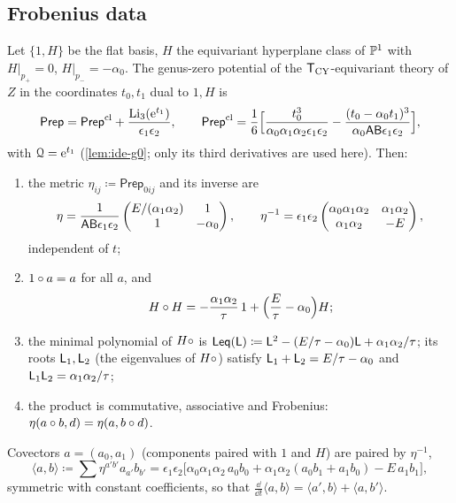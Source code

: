 \subsection{Frobenius data}
\label{sec:set-frob}

\begin{prop}
\label{prop:set-frob}
Let $\{1,H\}$ be the flat basis, $H$ the equivariant hyperplane class of $\mathbb{P}^1$ with $H|_{p_+}=0$, $H|_{p_-}=-\alpha_0$. The genus-zero potential of the $\mathsf{T}_{\mathrm{CY}}$-equivariant theory of $Z$ in the coordinates $t_0,t_1$ dual to $1,H$ is
\[
\mathsf{Prep}=\mathsf{Prep}^{\mathrm{cl}}+\frac{\operatorname{Li}_3(\mathrm{e}^{t_1})}{\epsilon_1\epsilon_2},\qquad
\mathsf{Prep}^{\mathrm{cl}}=\frac16\Big[\frac{t_0^3}{\alpha_0\alpha_1\alpha_2\epsilon_1\epsilon_2}-\frac{(t_0-\alpha_0t_1)^3}{\alpha_0\mathsf{A}\mathsf{B}\epsilon_1\epsilon_2}\Big],
\]
with $\mathcal{Q}=\mathrm{e}^{t_1}$ (\cref{lem:ide-g0}; only its third derivatives are used here). Then:
\begin{enumerate}
\item the metric $\eta_{ij}\coloneqq\mathsf{Prep}_{0ij}$ and its inverse are
\[
\eta=\frac{1}{\mathsf{A}\mathsf{B}\epsilon_1\epsilon_2}\begin{pmatrix}E/(\alpha_1\alpha_2)&1\\1&-\alpha_0\end{pmatrix},\qquad
\eta^{-1}=\epsilon_1\epsilon_2\begin{pmatrix}\alpha_0\alpha_1\alpha_2&\alpha_1\alpha_2\\\alpha_1\alpha_2&-E\end{pmatrix},
\]
independent of $t$;
\item $1\circ a=a$ for all $a$, and
\[
H\circ H=-\frac{\alpha_1\alpha_2}{\tau}\,1+\Big(\frac E\tau-\alpha_0\Big)H ;
\]
\item the minimal polynomial of $H\circ$ is $\mathsf{Leq}(\mathsf{L})\coloneqq\mathsf{L}^2-(E/\tau-\alpha_0)\mathsf{L}+\alpha_1\alpha_2/\tau$; its roots $\mathsf{L}_1,\mathsf{L}_2$ (the eigenvalues of $H\circ$) satisfy $\mathsf{L}_1+\mathsf{L}_2=E/\tau-\alpha_0$ and $\mathsf{L}_1\mathsf{L}_2=\alpha_1\alpha_2/\tau$;
\item the product is commutative, associative and Frobenius: $\eta(a\circ b,d)=\eta(a,b\circ d)$.
\end{enumerate}
Covectors $a=(a_0,a_1)$ (components paired with $1$ and $H$) are paired by $\eta^{-1}$,
\begin{equation}
\label{eq:set-pairing}
\langle a,b\rangle\coloneqq\sum\eta^{a'b'}a_{a'}b_{b'}=\epsilon_1\epsilon_2\big[\alpha_0\alpha_1\alpha_2\,a_0b_0+\alpha_1\alpha_2(a_0b_1+a_1b_0)-E\,a_1b_1\big],
\end{equation}
symmetric with constant coefficients, so that $\frac{\dd}{\dd t}\langle a,b\rangle=\langle a',b\rangle+\langle a,b'\rangle$.
\end{prop}

